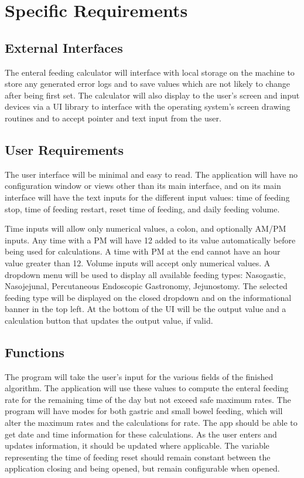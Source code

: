\documentclass[fullpage,10pt, onecolumn, draftclsnofoot]{IEEEtran}
\begin{document}
\section{Specific Requirements}

\subsection{External Interfaces}
The enteral feeding calculator will interface with local storage on the machine to store any generated error logs and to save values which are not likely to change after being first set.
The calculator will also display to the user's screen and input devices via a UI library to interface with the operating system's screen drawing routines and to accept pointer and text input from the user.

\subsection{User Requirements}
The user interface will be minimal and easy to read. The application will have no configuration window
or views other than its main interface, and on its main interface will have the text inputs for the different
input values: time of feeding stop, time of feeding restart, reset time of feeding, and daily feeding volume.

Time inputs will allow only numerical values, a colon, and optionally AM/PM inputs. Any time with a PM will
have 12 added to its value automatically before being used for calculations. A time with PM at the end cannot have an hour value greater than 12.
Volume inputs will accept only numerical values.
A dropdown menu will be used to display all available feeding types: Nasogastic, Nasojejunal, Percutaneous Endoscopic Gastronomy, Jejunostomy.
The selected feeding type will be displayed on the closed dropdown and on the informational banner in the top left. 
At the bottom of the UI will be the output value and a calculation
button that updates the output value, if valid.

\subsection{Functions}
The program will take the user's input for the various fields of the finished algorithm.
The application will use these values to compute the enteral feeding rate for the remaining time of the day but not exceed safe maximum rates.
The program will have modes for both gastric and small bowel feeding, which will alter the maximum rates and the calculations for rate.
The app should be able to get date and time information for these calculations.
As the user enters and updates information, it should be updated where applicable.
The variable representing the time of feeding reset should remain constant between the application closing and being opened, but remain configurable when opened.
\end{document}
